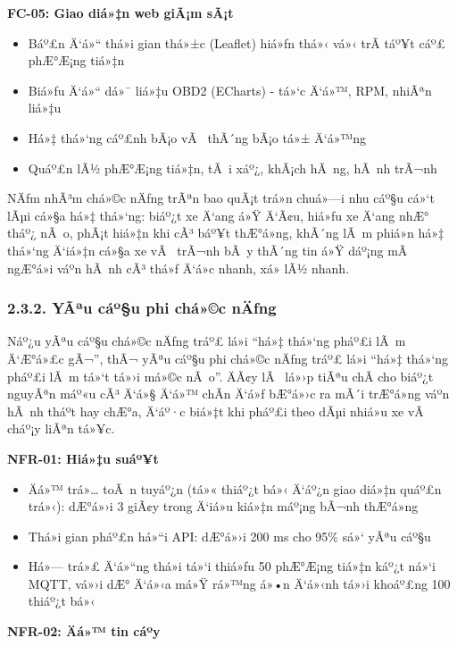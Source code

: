 \documentclass[a4paper]{extarticle}
\providecommand{\tightlist}{%
  \setlength{\itemsep}{0pt}\setlength{\parskip}{0pt}}
\begin{document}
\textbf{FC-05: Giao diá»‡n web giÃ¡m sÃ¡t}

\begin{itemize}
\tightlist
\item
  Báº£n Ä‘á»“ thá»i gian thá»±c (Leaflet) hiá»ƒn thá»‹ vá»‹ trÃ­ táº¥t cáº£ phÆ°Æ¡ng tiá»‡n
\item
  Biá»ƒu Ä‘á»“ dá»¯ liá»‡u OBD2 (ECharts) - tá»‘c Ä‘á»™, RPM, nhiÃªn liá»‡u
\item
  Há»‡ thá»‘ng cáº£nh bÃ¡o vÃ  thÃ´ng bÃ¡o tá»± Ä‘á»™ng
\item
  Quáº£n lÃ½ phÆ°Æ¡ng tiá»‡n, tÃ i xáº¿, khÃ¡ch hÃ ng, hÃ nh trÃ¬nh
\end{itemize}

NÄƒm nhÃ³m chá»©c nÄƒng trÃªn bao quÃ¡t trá»n chuá»—i nhu cáº§u cá»‘t lÃµi cá»§a há»‡
thá»‘ng: biáº¿t xe Ä‘ang á»Ÿ Ä‘Ã¢u, hiá»ƒu xe Ä‘ang nhÆ° tháº¿ nÃ o, phÃ¡t hiá»‡n khi cÃ³
báº¥t thÆ°á»ng, khÃ´ng lÃ m phiá»n há»‡ thá»‘ng Ä‘iá»‡n cá»§a xe vÃ  trÃ¬nh bÃ y thÃ´ng tin á»Ÿ
dáº¡ng mÃ  ngÆ°á»i váº­n hÃ nh cÃ³ thá»ƒ Ä‘á»c nhanh, xá»­ lÃ½ nhanh.

\subsubsection{2.3.2. YÃªu cáº§u phi chá»©c
nÄƒng}\label{232-yuxeau-cux1ea7u-phi-chux1ee9c-nux103ng}

Náº¿u yÃªu cáº§u chá»©c nÄƒng tráº£ lá»i ``há»‡ thá»‘ng pháº£i lÃ m Ä‘Æ°á»£c gÃ¬'', thÃ¬ yÃªu cáº§u
phi chá»©c nÄƒng tráº£ lá»i ``há»‡ thá»‘ng pháº£i lÃ m tá»‘t tá»›i má»©c nÃ o''. ÄÃ¢y lÃ  lá»›p
tiÃªu chÃ­ cho biáº¿t nguyÃªn máº«u cÃ³ Ä‘á»§ Ä‘á»™ chÃ­n Ä‘á»ƒ bÆ°á»›c ra mÃ´i trÆ°á»ng váº­n
hÃ nh tháº­t hay chÆ°a, Ä‘áº·c biá»‡t khi pháº£i theo dÃµi nhiá»u xe vÃ  cháº¡y liÃªn
tá»¥c.

\textbf{NFR-01: Hiá»‡u suáº¥t}

\begin{itemize}
\tightlist
\item
  Äá»™ trá»… toÃ n tuyáº¿n (tá»« thiáº¿t bá»‹ Ä‘áº¿n giao diá»‡n quáº£n trá»‹): dÆ°á»›i 3 giÃ¢y trong Ä‘iá»u
  kiá»‡n máº¡ng bÃ¬nh thÆ°á»ng
\item
  Thá»i gian pháº£n há»“i API: dÆ°á»›i 200 ms cho 95\% sá»‘ yÃªu cáº§u
\item
  Há»— trá»£ Ä‘á»“ng thá»i tá»‘i thiá»ƒu 50 phÆ°Æ¡ng tiá»‡n káº¿t ná»‘i MQTT, vá»›i dÆ° Ä‘á»‹a má»Ÿ
  rá»™ng á»•n Ä‘á»‹nh tá»›i khoáº£ng 100 thiáº¿t bá»‹
\end{itemize}

\textbf{NFR-02: Äá»™ tin cáº­y}
\end{document}
